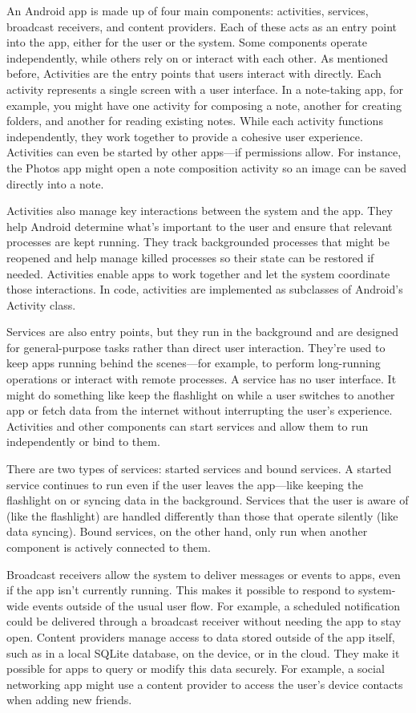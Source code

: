 An Android app is made up of four main components: activities, services, broadcast receivers, and content providers. Each of these acts as an entry point into the app, either for the user or the system. Some components operate independently, while others rely on or interact with each other. As mentioned before, Activities are the entry points that users interact with directly. Each activity represents a single screen with a user interface. In a note-taking app, for example, you might have one activity for composing a note, another for creating folders, and another for reading existing notes. While each activity functions independently, they work together to provide a cohesive user experience. Activities can even be started by other apps—if permissions allow. For instance, the Photos app might open a note composition activity so an image can be saved directly into a note.

Activities also manage key interactions between the system and the app. They help Android determine what’s important to the user and ensure that relevant processes are kept running. They track backgrounded processes that might be reopened and help manage killed processes so their state can be restored if needed. Activities enable apps to work together and let the system coordinate those interactions. In code, activities are implemented as subclasses of Android’s Activity class.

Services are also entry points, but they run in the background and are designed for general-purpose tasks rather than direct user interaction. They’re used to keep apps running behind the scenes—for example, to perform long-running operations or interact with remote processes. A service has no user interface. It might do something like keep the flashlight on while a user switches to another app or fetch data from the internet without interrupting the user’s experience. Activities and other components can start services and allow them to run independently or bind to them.

There are two types of services: started services and bound services. A started service continues to run even if the user leaves the app—like keeping the flashlight on or syncing data in the background. Services that the user is aware of (like the flashlight) are handled differently than those that operate silently (like data syncing). Bound services, on the other hand, only run when another component is actively connected to them.

Broadcast receivers allow the system to deliver messages or events to apps, even if the app isn't currently running. This makes it possible to respond to system-wide events outside of the usual user flow. For example, a scheduled notification could be delivered through a broadcast receiver without needing the app to stay open.
Content providers manage access to data stored outside of the app itself, such as in a local SQLite database, on the device, or in the cloud. They make it possible for apps to query or modify this data securely. For example, a social networking app might use a content provider to access the user’s device contacts when adding new friends.

